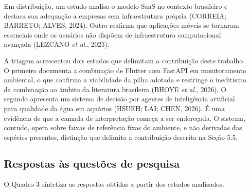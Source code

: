 \documentclass[12pt,oneside,a4paper,brazilian]{abntex2}
\begin{document}
Em distribuição, um estudo analisa o modelo SaaS no contexto brasileiro e destaca sua adequação a empresas sem infraestrutura própria (CORREIA; BARRETO; ALVES, 2024). Outro reafirma que aplicações móveis se tornaram essenciais onde os usuários não dispõem de infraestrutura computacional avançada (LEZCANO \textit{et al.}, 2023).

A triagem acrescentou dois estudos que delimitam a contribuição deste trabalho. O primeiro documenta a combinação de Flutter com FastAPI em monitoramento ambiental, o que confirma a viabilidade da pilha adotada e restringe o ineditismo da combinação ao âmbito da literatura brasileira (BHOYE \textit{et al.}, 2026). O segundo apresenta um sistema de decisão por agentes de inteligência artificial para qualidade da água em aquários (HSUEH; LAI; CHEN, 2026). É uma evidência de que a camada de interpretação começa a ser endereçada. O sistema, contudo, opera sobre faixas de referência fixas do ambiente, e não derivadas das espécies presentes, distinção que delimita a contribuição descrita na Seção 5.5.


\subsection{Respostas às questões de pesquisa}
O Quadro 3 sintetiza as respostas obtidas a partir dos estudos analisados.
\end{document}
